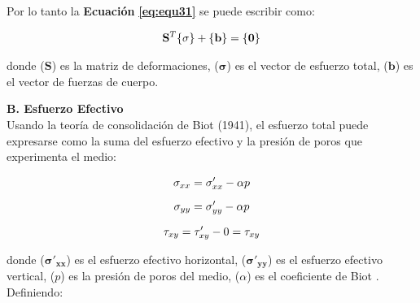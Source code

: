 Por lo tanto la \textbf{Ecuación} \textbf{\ref{eq:equ31}} se puede escribir como:

\begin{ceqn} 
\begin{gather} \label{eq:equ33} 
\normalsize{\mathbf{S}^T\{\mathbf{\sigma}\}+\{\mathbf{b}\}=\{\mathbf{0}\}}
\end{gather}  
\end{ceqn}
donde ($\mathbf{S}$) es la matriz de deformaciones, ($\mathbf{\sigma}$) es el vector de esfuerzo total, ($\mathbf{b}$) es el vector de fuerzas de cuerpo.\vspace{1cm}


\textbf{B. Esfuerzo Efectivo}
\\
Usando la teoría de consolidación de Biot (1941)\cite{Biot1941GeneralConsolidation}, el esfuerzo total puede expresarse como la suma del esfuerzo efectivo y la presión de poros que experimenta el medio:

\begin{ceqn} 
\begin{subequations} \label{eq:equ34} 
\begin{gather}
\normalsize{\sigma_{xx} = \sigma'_{xx} - \alpha p} \label{eq:equ34a} \\[6pt]
\normalsize{\sigma_{yy} = \sigma'_{yy} - \alpha p} \label{eq:equ34b} \\[6pt]
\normalsize{\tau_{xy} = \tau'_{xy} - 0 = \tau_{xy}} \label{eq:equ34c}
\end{gather}  
\end{subequations} 
\end{ceqn}
donde ($\mathbf{\sigma'_{xx}}$) es el esfuerzo efectivo horizontal,  ($\mathbf{\sigma'_{yy}}$) es el esfuerzo efectivo vertical, ($p$) es la presión de poros del medio, ($\alpha$) es el coeficiente de Biot \cite{Biot1941GeneralConsolidation}. Definiendo:

